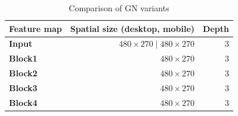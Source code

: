 \begin{table}
    \centering
    \begin{tabular}{lrr}
        \textbf{Feature map} & \textbf{Spatial size (desktop, mobile)} & \textbf{Depth}\\\hline
        \textbf{Input} & $480\times270\mid480\times270$ & $3$\\
        \textbf{Block1} & $480\times270$ & $3$\\
        \textbf{Block2} & $480\times270$ & $3$\\
        \textbf{Block3} & $480\times270$ & $3$\\
        \textbf{Block4} & $480\times270$ & $3$\\
    \end{tabular}
    \caption[Comparison of GN variants]{Comparison of GN variants}
    \label{tab:activationmaptensors}
\end{table}

